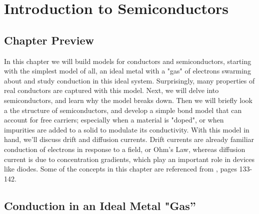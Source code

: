 \chapter{Introduction to Semiconductors}
\label{ch:ch03_semi}
\graphicspath{{./figs_semi/}}
\section{Chapter Preview}
In this chapter we will build models for conductors and semiconductors, starting with the simplest model of all, an ideal metal with a "gas" of electrons swarming about and study conduction in this ideal system.  Surprisingly, many properties of real conductors are captured with this model.  Next, we will delve into semiconductors, and learn why the model breaks down.  Then we will briefly look a the structure of semiconductors, and  develop a simple bond model that can account for free carriers; especially when a material is "doped", or when impurities are added to a solid to modulate its conductivity.  With this model in hand, we'll discuss drift and diffusion currents.  Drift currents are already familiar conduction of electrons in response to a field, or Ohm's Law, whereas diffusion current is due to concentration gradients, which play an important role in devices like diodes.  Some of the concepts in this chapter are referenced from \cite{purcell}, pages 133-142.
\section{Conduction in an Ideal Metal "Gas''}
